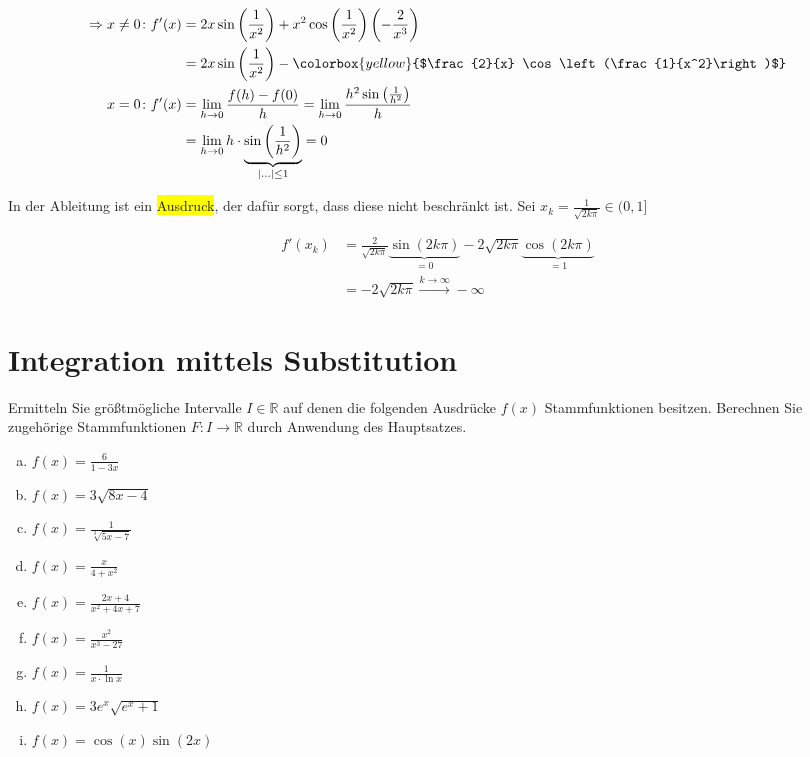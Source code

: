 \documentclass{article}
\begin{document}
\begin{enumerate}[a)]
  
  \begin{align*}
    \Rightarrow x \ne 0 \colon f'(x) &= 2x \sin\left(\frac{1}{x^2}\right) + x^2 \cos\left(\frac{1}{x^2}\right)\left(-\frac{2}{x^3}\right) \\
                                     &= 2x \sin\left(\frac{1}{x^2}\right) - \colorbox{yellow}{$\frac{2}{x} \cos\left(\frac{1}{x^2}\right)$} \\
    x = 0 \colon f'(x) &= \lim_{h \to 0} \frac{f(h) - f(0)}{h} = \lim_{h \to 0} \frac{h^2 \sin\left(\frac{1}{h^2}\right)}{h} \\
                                     &= \lim_{h \to 0} h \cdot \underset{\abs{\ldots} \leq 1}{\underbrace{\sin\left(\frac{1}{h^2}\right)}} = 0 \\
  \end{align*}

  In der Ableitung ist ein \colorbox{yellow}{Ausdruck}, der dafür sorgt, dass diese nicht beschränkt ist.
  Sei $x_k = \frac{1}{\sqrt{2k\pi}} \in (0, 1]$

  \begin{align*}
    f'(x_k) &= \frac{2}{\sqrt{2k\pi}} \underset{= 0}{\underbrace{\sin(2k\pi)}} - 2 \sqrt{2k\pi} \underset{= 1}{\underbrace{\cos(2k\pi)}} \\
            &= - 2 \sqrt{2k\pi} \overset{k \to \infty}{\longrightarrow} -\infty
  \end{align*}
  
\end{enumerate}

\section*{Integration mittels Substitution}

Ermitteln Sie größtmögliche Intervalle $I \in \mathbb{R}$ auf denen die
folgenden Ausdrücke $f(x)$ Stammfunktionen besitzen.
Berechnen Sie zugehörige Stammfunktionen $F \colon I \to \mathbb{R}$
durch Anwendung des Hauptsatzes.

\begin{enumerate}[a)]
\item $f(x) = \frac{6}{1 - 3x}$
\item $f(x) = 3 \sqrt{8x - 4}$
\item $f(x) = \frac{1}{\sqrt[3]{5x - 7}}$
\item $f(x) = \frac{x}{4 + x^2}$
\item $f(x) = \frac{2x + 4}{x^2 + 4x + 7}$
\item $f(x) = \frac{x^2}{x^3 - 27}$
\item $f(x) = \frac{1}{x \cdot \ln x}$
\item $f(x) = 3e^x \sqrt{e^x + 1}$
\item $f(x) = \cos(x) \sin(2x)$
\end{enumerate}
\end{document}
